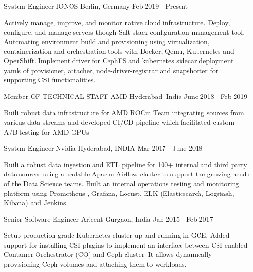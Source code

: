 
\begin{cventries}
  \cventry
    {System Engineer}
    {IONOS}
    {Berlin, Germany}
    {Feb 2019 - Present}
    {
      \begin{cvitems}
        \item {Actively manage, improve, and monitor native cloud infrastructure. Deploy, configure, and manage servers though Salt stack configuration management tool. Automating environment build and provisioning using virtualization, containerization and orchestration tools with Docker, Qemu, Kubernetes and OpenShift.  Implement driver for CephFS and kubernetes sidecar deployment yamls of provisioner, attacher, node-driver-registrar and snapshotter for supporting CSI functionalities. }
      \end{cvitems}
    }	

  \cventry
    {Member OF TECHNICAL STAFF}
    {AMD}
    {Hyderabad, India}
    {June 2018 - Feb 2019}
    {
      \begin{cvitems}
        \item {Built robust data infrastructure for AMD ROCm Team integrating sources from various data streams and developed CI/CD pipeline which facilitated custom A/B testing for AMD GPUs. }
      \end{cvitems}
    }	

  \cventry
    {System Engineer}
    {Nvidia}
    {Hyderabad, INDIA}
    {Mar 2017 - June 2018 }
    {
      \begin{cvitems}
        \item {Built a robust data ingestion and ETL pipeline for 100+ internal and third party data sources using a scalable Apache Airflow cluster to support the growing needs of the Data Science teams. Built an internal operations testing and monitoring platform using Prometheus , Grafana, Locust, ELK (Elasticsearch, Logstash, Kibana) and Jenkins. }
      \end{cvitems}
    }	
    
  \cventry
    {Senior Software Engineer}
    {Aricent}
    {Gurgaon, India}
    {Jan 2015 - Feb 2017}
    {
      \begin{cvitems}
        \item {Setup production-grade Kubernetes cluster up and running in GCE. Added support for installing CSI plugins to implement an interface between CSI enabled Container Orchestrator (CO) and Ceph cluster. It allows dynamically provisioning Ceph volumes and attaching them to workloads. }
      \end{cvitems}
    }	  
	  

\end{cventries}
